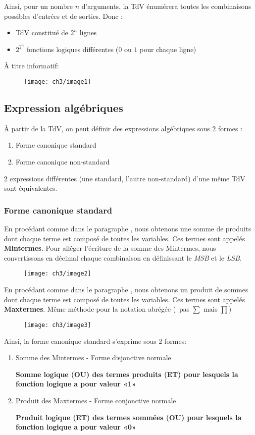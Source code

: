 Ainsi, pour un nombre $n$ d'arguments, la TdV énumérera toutes les combinaisons possibles d'entrées et de sorties. Donc :
\begin{itemize}
	\item TdV constitué de $2^n$ lignes
	\item $2^{2^n}$ fonctions logiques différentes ($0$ ou $1$ pour chaque ligne)
\end{itemize}
À titre informatif:
\begin{figure}[H]
	\centering
	\texttt{[image: ch3/image1]}
\end{figure}

\subsection{Expression algébriques}
À partir de la TdV, on peut définir des expressions algébriques sous 2 formes :
\begin{enumerate}
	\item Forme canonique standard
	\item Forme canonique non-standard
\end{enumerate}
2 expressions différentes (une standard, l'autre non-standard) d'une même TdV sont équivalentes.
\subsubsection{Forme canonique standard}
En procédant comme dans le paragraphe , nous obtenons une somme de produits dont chaque terme est composé de toutes les variables. Ces termes sont appelés \textbf{Mintermes}. Pour alléger l'écriture de la somme des Mintermes, nous convertissons en décimal chaque combinaison en définissant le \textit{MSB} et le \textit{LSB}.
\begin{figure}[H]
	\centering
	\texttt{[image: ch3/image2]}
\end{figure}


En procédant comme dans le paragraphe , nous obtenons un produit de sommes dont chaque terme est composé de toutes les variables. Ces termes sont appelés \textbf{Maxtermes}. Même méthode pour la notation abrégée (\danger\ pas $\sum$ mais $\prod$)
\begin{figure}[H]
	\centering
	\texttt{[image: ch3/image3]}
\end{figure}
Ainsi, la forme canonique standard s'exprime sous 2 formes: 
\begin{enumerate}
	\item Somme des Mintermes - Forme disjonctive normale
	\begin{center}
		\textbf{Somme logique (OU) des termes produits (ET) pour lesquels la fonction logique a pour valeur «1»}
	\end{center}
	\item Produit des Maxtermes - Forme conjonctive normale
	\begin{center}
		\textbf{Produit logique (ET) des termes sommées (OU) pour lesquels la fonction logique a pour valeur «0»}
	\end{center}
\end{enumerate}
